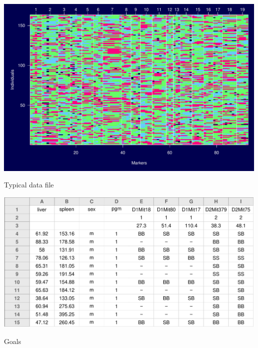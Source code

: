 \documentclass[12pt]{article}
\newcommand{\headsize}{\fontsize{35}{35} \selectfont}
\newcommand{\smallsize}{\fontsize{25}{30} \selectfont}
\begin{document}
\centerline{\includegraphics{Figs/genodata.pdf}}



\newpage

\headsize \color{myyellow}
\hfill \begin{minipage}{5.75in}
\centering
Typical data file
\end{minipage}

\vspace{20mm}

\centerline{\includegraphics[width=9in]{Figs/datafile.pdf}}






\newpage

\headsize \color{myyellow}
\hfill \begin{minipage}{5.75in}
\centering
Goals
\end{minipage}

\vspace{3cm}

\color{mywhite} \smallsize
\end{document}
